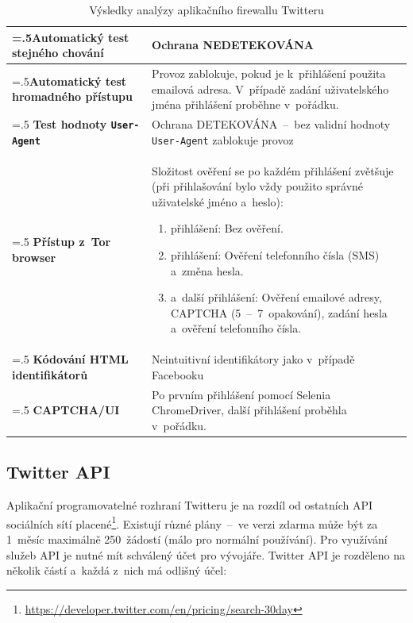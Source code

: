 \begin{table}[H]
\begin{tabularx}{\linewidth}{
  |>{\raggedright\arraybackslash\hsize=.5\hsize}X|>{\hsize=1.5\hsize}X|
  }

\hline
\textbf{Automatický test stejného chování} & Ochrana NEDETEKOVÁNA \\
\hline
\textbf{Automatický test hromadného přístupu} & Provoz zablokuje, pokud je k~přihlášení použita emailová adresa. V~případě zadání uživatelského jména přihlášení proběhne v~pořádku. \\
\hline
\textbf{Test hodnoty \texttt{User-Agent}} & Ochrana DETEKOVÁNA~--~bez validní hodnoty \texttt{User-Agent} zablokuje provoz \\
\hline
\textbf{Přístup z~Tor browser} & Složitost ověření se po každém přihlášení zvětšuje (při přihlašování bylo vždy použito správné uživatelské jméno a~heslo):
\begin{enumerate}
  \item přihlášení: Bez ověření.
  \item přihlášení: Ověření telefonního čísla (SMS) a~změna hesla.
  \item a~další přihlášení: Ověření emailové adresy, CAPTCHA (5~--~7~opakování), zadání hesla a~ověření telefonního čísla.
\end{enumerate}
\\ \hline
\textbf{Kódování HTML identifikátorů} & Neintuitivní identifikátory jako v~případě Facebooku\\
\hline
\textbf{CAPTCHA/UI} & Po prvním přihlášení pomocí Selenia ChromeDriver, další přihlášení proběhla v~pořádku. \\
\hline
\end{tabularx}
\label{tab:Twitter_analyse}
\caption{Výsledky analýzy aplikačního firewallu Twitteru}
\end{table}

\subsection*{Twitter API}
Aplikační programovatelné rozhraní Twitteru je na rozdíl od ostatních API sociálních sítí placené\footnote{\href{https://developer.twitter.com/en/pricing/search-30day}{https://developer.twitter.com/en/pricing/search-30day}}. Existují různé plány~--~ve verzi zdarma může být za 1~měsíc maximálně 250~žádostí (málo pro normální používání). Pro využívání služeb API je nutné mít schválený účet pro vývojáře. Twitter API je rozděleno na několik částí a~každá z~nich má odlišný účel:

